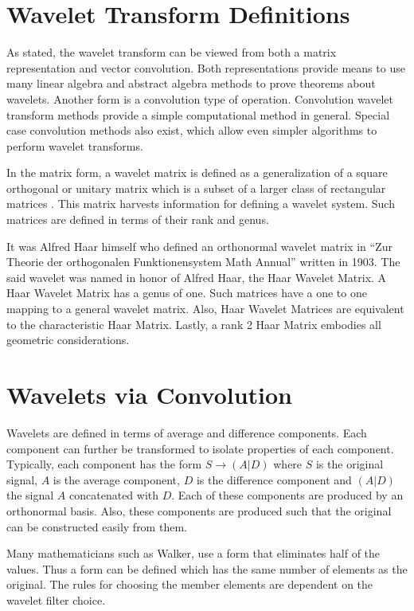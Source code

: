 \section{Wavelet Transform Definitions}

As stated, the wavelet transform can be viewed from both a matrix
representation\cite{matrix01} and vector convolution. Both
representations provide means to use many linear algebra and abstract
algebra methods to prove theorems about wavelets.  Another form is a
convolution type of operation. Convolution wavelet transform methods
provide a simple computational method in general. Special case
convolution methods also exist, which allow even simpler algorithms to
perform wavelet transforms.

In the matrix form, a wavelet matrix is defined as a generalization of
a square orthogonal or unitary matrix which is a subset of a larger
class of rectangular matrices . This matrix harvests information for
defining a wavelet system.  Such matrices are defined in terms of
their rank and genus\cite{matrix01}.

It was Alfred Haar himself who defined an orthonormal wavelet matrix
in ``Zur Theorie der orthogonalen Funktionensystem Math Annual''
written in 1903. The said wavelet was named in honor of Alfred Haar,
the Haar Wavelet Matrix. A Haar Wavelet Matrix has a genus of
one. Such matrices have a one to one mapping to a general wavelet
matrix. Also, Haar Wavelet Matrices are equivalent to the
characteristic Haar Matrix. Lastly, a rank 2 Haar Matrix embodies all
geometric considerations\cite{matrix01}.

\section{Wavelets via Convolution}

Wavelets are defined in terms of average and difference components.
Each component can further be transformed to isolate properties of
each component.  Typically, each component has the form $S\rightarrow
(A|D)$ where $S$ is the original signal, $A$ is the average component, $D$
is the difference component and $(A|D)$ the signal $A$ concatenated with
$D$.  Each of these components are produced by an orthonormal basis.
Also, these components are produced such that the original can be
constructed easily from them.

Many mathematicians such as Walker\cite{walker}, use a form that
eliminates half of the values. Thus a form can be defined which has
the same number of elements as the original.  The rules for choosing
the member elements are dependent on the wavelet filter choice.


